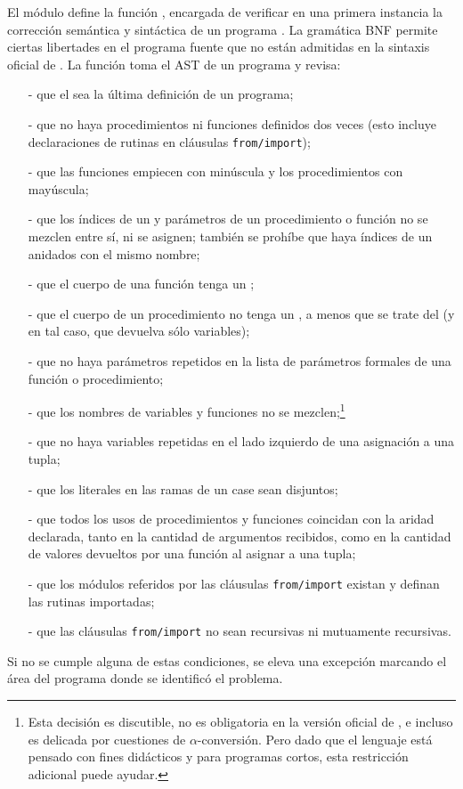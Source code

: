 \documentclass{article}
\newcommand{\fromImportClause}{\texttt{from/import}\xspace}
\begin{document}
El m\'odulo  define la funci\'on
, encargada de veri\-fi\-car en una primera
instancia la correcci\'on sem\'antica y sint\'actica de un programa \Gbs.
La gram\'atica BNF permite ciertas libertades en el programa fuente
que no est\'an admitidas en la sintaxis oficial de \Gbs.
La funci\'on toma el AST de un programa y revisa:
  \begin{itemize}
  \item[-] que el  sea la \'ultima definici\'on de un programa;
  \item[-] que no haya procedimientos ni funciones definidos dos veces
           (esto incluye declaraciones de rutinas en cl\'ausulas \fromImportClause);
  \item[-] que las funciones empiecen con min\'uscula y los procedimientos
           con may\'uscula;
  \item[-] que los \'indices de un  y par\'ametros
           de un procedimiento o funci\'on no se mezclen entre s\'i,
           ni se asignen; tambi\'en se proh\'ibe que haya \'indices
           de un  anidados con el mismo nombre;
  \item[-] que el cuerpo de una funci\'on tenga un ;
  \item[-] que el cuerpo de un procedimiento no tenga un ,
           a menos que se trate del  (y en tal caso, que
           devuelva s\'olo variables);
  \item[-] que no haya par\'ametros repetidos en la lista de
           par\'ametros formales de una funci\'on o procedimiento;
  \item[-] que los nombres de variables y funciones no se mezclen;\footnote{
           Esta decisi\'on es discutible, no es obligatoria en la versi\'on
           oficial de \Gbs, e incluso es delicada por cuestiones de $\alpha$-conversi\'on.
           Pero dado que el lenguaje est\'a pensado con fines did\'acticos
           y para programas cortos, esta restricci\'on adicional
           puede ayudar.}
  \item[-] que no haya variables repetidas en el lado izquierdo
           de una asignaci\'on a una tupla;
  \item[-] que los literales en las ramas de un case sean disjuntos;
  \item[-] que todos los usos de procedimientos y funciones
           coincidan con la aridad declarada, tanto en la
           cantidad de argumentos recibidos, como en la cantidad
           de valores devueltos por una funci\'on al asignar
           a una tupla;
  \item[-] que los m\'odulos referidos por las cl\'ausulas
           \fromImportClause existan y definan las
           rutinas importadas;
  \item[-] que las cl\'ausulas \fromImportClause no sean
           recursivas ni mutuamente recursivas.
           
  \end{itemize}
Si no se cumple alguna de estas condiciones, se eleva una
excepci\'on marcando el \'area del programa donde se
identific\'o el problema.
\end{document}
